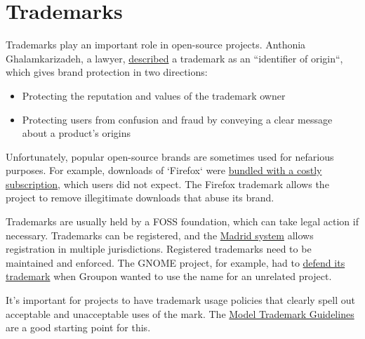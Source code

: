 


\chapter{Trademarks}

Trademarks play an important role in open-source projects.  Anthonia Ghalamkarizadeh, a lawyer, \href{https://lwn.net/Articles/546678/}{described} a trademark as an ``identifier of origin``, which gives brand protection in two directions:

\begin{itemize}

\itemsep 0.50em

\item Protecting the reputation and values of the trademark owner

\item Protecting users from confusion and fraud by conveying a clear message about a product's origins

\end{itemize}

Unfortunately, popular open-source brands are sometimes used for nefarious purposes.  For example, downloads of `Firefox` were \href{https://lwn.net/Articles/546678/}{bundled with a costly subscription}, which users did not expect.  The Firefox trademark allows the project to remove illegitimate downloads that abuse its brand.

Trademarks are usually held by a FOSS foundation, which can take legal action if necessary.  Trademarks can be registered, and the \href{https://en.wikipedia.org/wiki/Madrid_system}{Madrid system} allows registration in multiple jurisdictions.  Registered trademarks need to be maintained and enforced.  The GNOME project, for example, had to \href{https://lwn.net/Articles/654124/}{defend its trademark} when Groupon wanted to use the name for an unrelated project.

It's important for projects to have trademark usage policies that clearly spell out acceptable and unacceptable uses of the mark.  The \href{http://modeltrademarkguidelines.org/}{Model Trademark Guidelines} are a good starting point for this.

